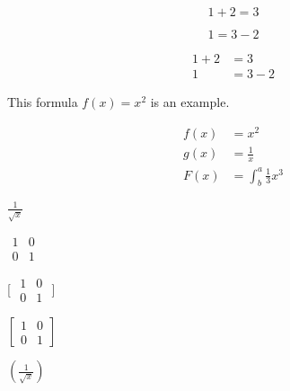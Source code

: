 \documentclass{article}
\begin{document}
\begin{equation*}
  1 + 2 = 3 
\end{equation*}

\begin{equation*}
  1 = 3 - 2
\end{equation*}

\begin{align*}
  1 + 2 &= 3\\
  1 &= 3 - 2
\end{align*}

This formula $f(x) = x^2$ is an example.

\begin{align*}
  f(x) &= x^2\\
  g(x) &= \frac{1}{x}\\
  F(x) &= \int^a_b \frac{1}{3}x^3
\end{align*}


$\frac{1}{\sqrt{x}}$


$\begin{matrix}
1 & 0\\
0 & 1
\end{matrix}$


[
$\begin{matrix}
1 & 0\\
0 & 1
\end{matrix}$
]


$\left[
\begin{matrix}
1 & 0\\
0 & 1
\end{matrix}
\right]$


$\left(\frac{1}{\sqrt{x}}\right)$
\end{document}
